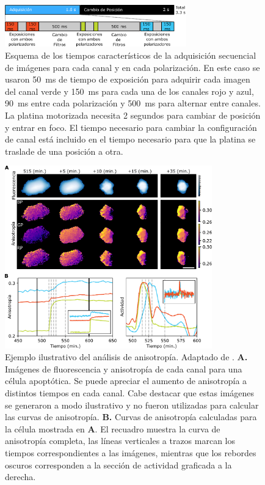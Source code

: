 \begin{figure}
    \centering
    \includegraphics[width=0.7\textwidth]{img/cap_4/tiempo_adq_tres_canales.pdf}
    \caption{\footnotesize{Esquema de los tiempos característicos de la adquisición secuencial de imágenes para cada canal y en cada polarización. En este caso se usaron 50~ms de tiempo de exposición para adquirir cada imagen del canal verde y 150~ms para cada una de los canales rojo y azul, 90~ms entre cada polarización y 500~ms para alternar entre canales. La platina motorizada necesita 2 segundos para cambiar de posición y entrar en foco. El tiempo necesario para cambiar la configuración de canal está incluido en el tiempo necesario para que la platina se traslade de una posición a otra.}}
    \label{fig:tiempo_adq_tres_canales}
\end{figure}

\begin{figure}[htb]
    \centering
    \includegraphics[width=0.8\textwidth]{img/cap_4/cels_anis.pdf}
    \caption{\footnotesize{Ejemplo ilustrativo del análisis de anisotropía. Adaptado de \cite{Habif2021}. \textbf{A.} Imágenes de fluorescencia y anisotropía de cada canal para una célula apoptótica. Se puede apreciar el aumento de anisotropía a distintos tiempos en cada canal. Cabe destacar que estas imágenes se generaron a modo ilustrativo y no fueron utilizadas para calcular las curvas de anisotropía. \textbf{B.} Curvas de anisotropía calculadas para la célula mostrada en \textbf{A}. El recuadro muestra la curva de anisotropía completa, las líneas verticales a trazos marcan los tiempos correspondientes a las imágenes, mientras que los rebordes oscuros corresponden a la sección de actividad graficada a la derecha.}}
    \label{fig:cels_anis}
\end{figure}

